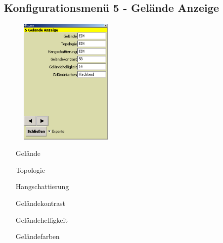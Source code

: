 \subsection{Konfigurationsmenü 5 - Gelände Anzeige}\label{Konfig5}
\begin{figure}
\includegraphics[width=4.5cm]{Bilder/Konfig5Gelaendeanzeige.png}
\end{figure}
\begin{enumerate}
\item[Gelände]
\item[Topologie]
\item[Hangschattierung]
\item[Geländekontrast]
\item[Geländehelligkeit]
\item[Geländefarben]
\end{enumerate}

